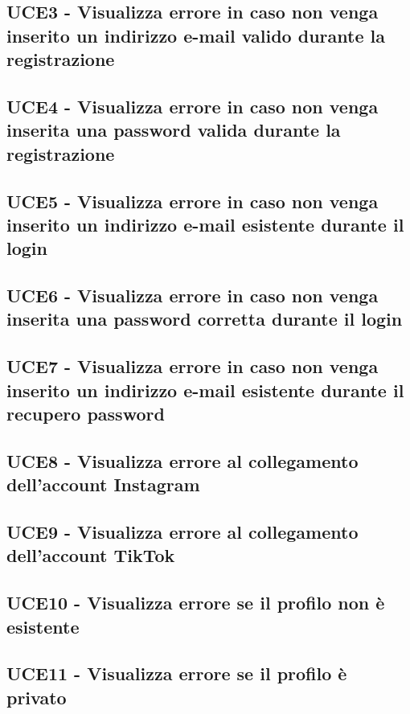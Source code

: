 \documentclass[a4paper]{article}
\begin{document}
	\subsection{UCE3 - Visualizza errore in caso non venga inserito un indirizzo e-mail valido durante la registrazione}
		
	
	\subsection{UCE4 - Visualizza errore in caso non venga inserita una password valida durante la registrazione}
	
	
	\subsection{UCE5 - Visualizza errore in caso non venga inserito un indirizzo e-mail esistente durante il login}
	

	\subsection{UCE6 - Visualizza errore in caso non venga inserita una password corretta durante il login}
		

	\subsection{UCE7 - Visualizza errore in caso non venga inserito un indirizzo e-mail esistente durante il recupero password}
	
	
	\subsection{UCE8 - Visualizza errore al collegamento dell'account Instagram}
		

	\subsection{UCE9 - Visualizza errore al collegamento dell'account TikTok}
				
	
	\subsection{UCE10 - Visualizza errore se il profilo non è esistente}
	
	
	\subsection{UCE11 - Visualizza errore se il profilo è privato}
	
	
\end{document}
